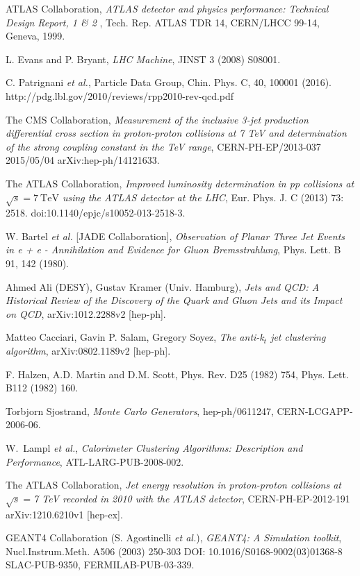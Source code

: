 \documentclass[UKenglish,texlive=2013]{\ATLASLATEXPATH atlasdoc}
\begin{document}
\begin{thebibliography}{9}
  ATLAS Collaboration,
  \emph{ATLAS detector and physics performance: Technical Design Report, 1 \& 2} ,
  Tech. Rep. ATLAS TDR 14, CERN/LHCC 99-14, Geneva, 1999.

L. Evans and P. Bryant,
\emph{LHC Machine}, JINST 3 (2008) S08001.

C. Patrignani \emph{et al.},
Particle Data Group, Chin. Phys. C, 40, 100001 (2016).
http://pdg.lbl.gov/2010/reviews/rpp2010-rev-qcd.pdf

The CMS Collaboration,
\emph{Measurement of the inclusive 3-jet production differential
cross section in proton-proton collisions at 7 TeV and
determination of the strong coupling constant in the TeV
range},
CERN-PH-EP/2013-037
2015/05/04
arXiv:hep-ph/14121633.

The ATLAS Collaboration,
\emph{Improved luminosity determination in pp collisions at $\sqrt {s} = 7\ \mathrm{TeV}$ using the ATLAS detector at the LHC},
Eur. Phys. J. C (2013) 73: 2518. doi:10.1140/epjc/s10052-013-2518-3.

W. Bartel {\it et al.} [JADE Collaboration],
\emph{Observation of Planar Three Jet Events in e + e -
Annihilation and Evidence for Gluon Bremsstrahlung},
Phys. Lett. B 91, 142 (1980).

Ahmed Ali (DESY), Gustav Kramer (Univ. Hamburg),
\emph{Jets and QCD: A Historical Review of the Discovery of the Quark and Gluon Jets and its Impact on QCD},
arXiv:1012.2288v2 [hep-ph].

Matteo Cacciari, Gavin P. Salam, Gregory Soyez,
\emph{The anti-k$_t$ jet clustering algorithm},
arXiv:0802.1189v2 [hep-ph]. 

F. Halzen, A.D. Martin and D.M. Scott,  
Phys. Rev. D25 (1982) 754,
Phys. Lett. B112 (1982) 160.

Torbjorn Sjostrand,
\emph{Monte Carlo Generators},
hep-ph/0611247,
CERN-LCGAPP-2006-06.

W.~Lampl {\it et al.},
\emph{Calorimeter Clustering Algorithms: Description and Performance},
ATL-LARG-PUB-2008-002.

The ATLAS Collaboration,
\emph{Jet energy resolution in proton-proton collisions at $\sqrt{s}=$7 TeV recorded in 2010 with the ATLAS detector},
CERN-PH-EP-2012-191
arXiv:1210.6210v1  [hep-ex].

GEANT4 Collaboration (S. Agostinelli {\it et al.}), 
\emph{GEANT4: A Simulation toolkit},
Nucl.Instrum.Meth. A506 (2003) 250-303
DOI: 10.1016/S0168-9002(03)01368-8
SLAC-PUB-9350, FERMILAB-PUB-03-339.


\end{thebibliography}
\end{document}
